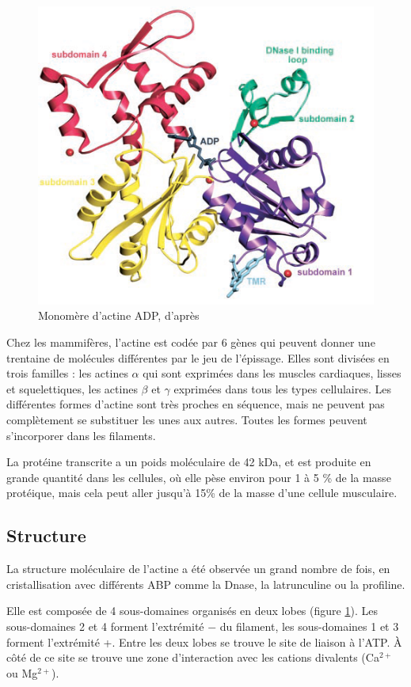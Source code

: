 \begin{figure}
\includegraphics[scale=0.7]{Actine_dominguez.png}
\caption{Monomère d'actine ADP, d'après \cite{otterbein_crystal_2001} \label{actine}}
\end{figure}

Chez les mammifères, l'actine est codée par 6 gènes qui peuvent donner une trentaine de molécules différentes par le jeu de l'épissage. 
Elles sont divisées en trois familles : les actines $\alpha$ qui sont exprimées dans les muscles cardiaques, lisses et squelettiques, les actines $\beta$ et $\gamma$ exprimées dans tous les types cellulaires.
Les différentes formes d'actine sont très proches en séquence, mais ne peuvent pas complètement se substituer les unes aux autres. Toutes les formes peuvent s'incorporer dans les filaments. 

La protéine transcrite a un poids moléculaire de 42 kDa, et est produite en grande quantité dans les cellules, où elle pèse environ pour 1 à 5 \% de la masse protéique, mais cela peut aller jusqu'à 15\% de la masse d'une cellule musculaire. 

\subsection{Structure}
La structure moléculaire de l'actine a été observée un grand nombre de fois, en cristallisation avec différents ABP comme la Dnase, la latrunculine ou la profiline. 

Elle est composée de 4 sous-domaines organisés en deux lobes (figure \ref{actine}). Les sous-domaines 2 et 4 forment l'extrémité $-$ du filament, les sous-domaines 1 et 3 forment l'extrémité +. Entre les deux lobes se trouve le site de liaison à l'ATP. 
À côté de ce site se trouve une zone d'interaction avec les cations divalents (Ca$^{2+}$ ou Mg$^{2+}$). 

